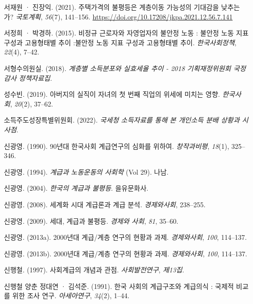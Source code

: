 \documentclass[
  letterpaper,
  DIV=11,
  numbers=noendperiod]{scrartcl}
\newlength{\cslhangindent}
\newenvironment{CSLReferences}[2] %
 {\begin{list}{}{%
  \setlength{\itemindent}{0pt}
  \setlength{\leftmargin}{0pt}
  \setlength{\parsep}{0pt}
  \ifodd #1
   \setlength{\leftmargin}{\cslhangindent}
   \setlength{\itemindent}{-1\cslhangindent}
  \fi
  \setlength{\itemsep}{#2\baselineskip}}}
 {\end{list}}
\begin{document}
\begin{CSLReferences}{1}{0}
서재원 · 진장익. (2021). {주택가격의 불평등은 계층이동 가능성의 기대감을
낮추는가?} \emph{국토계획}, \emph{56}(7), 141--156.
\url{https://doi.org/10.17208/jkpa.2021.12.56.7.141}

서정희 · 박경하. (2015). {비정규 근로자와 자영업자의 불안정 노동 :
불안정 노동 지표 구성과 고용형태별 추이 :불안정 노동 지표 구성과
고용형태별 추이}. \emph{한국사회정책}, \emph{22}(4), 7--42.

서형수의원실. (2018). \emph{계층별 소득분포와 실효세율 추이 - 2018
기획재정위원회 국정감사 정책자료집}.

성수빈. (2019). {아버지의 실직이 자녀의 첫 번째 직업의 위세에 미치는
영향}. \emph{한국사회}, \emph{20}(2), 37--62.

소득주도성장특별위원회. (2022). \emph{국세청 소득자료를 통해 본 개인소득
분배 상황과 시사점}.

신광영. (1990). {90년대 한국사회 계급연구의 심화를 위하여}.
\emph{창작과비평}, \emph{18}(1), 325--346.

신광영. (1994). \emph{{계급과 노동운동의 사회학}} (Vol 29). 나남.

신광영. (2004). \emph{{한국의 계급과 불평등}}. 을유문화사.

신광영. (2008). {세계화 시대 계급론과 계급 분석}. \emph{경제와사회},
238--255.

신광영. (2009). {세대, 계급과 불평등}. \emph{경제와 사회}, \emph{81},
35--60.

신광영. (2013a). {2000년대 계급/계층 연구의 현황과 과제}.
\emph{경제와사회}, \emph{100}, 114--137.

신광영. (2013b). {2000년대 계급/계층 연구의 현황과 과제}.
\emph{경제와사회}, \emph{100}, 114--137.

신행철. (1997). 사회계급의 개념과 관점. \emph{사회발전연구},
\emph{제13집}.

신행철 양춘 정대연 · 김석준. (1991). {한국 사회의 계급구조와 계급의식 :
국제적 비교를 위한 조사 연구}. \emph{아세아연구}, \emph{34}(2), 1--44.


\end{CSLReferences}
\end{document}
